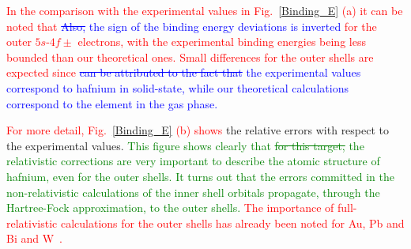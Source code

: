 \documentclass[aps,pra,reprint,superscriptaddress]{revtex4-1}
\def\clau#1{\textcolor{red}{#1}}
\def\duda#1{\textcolor{green}{#1}}
\def\ale#1{\textcolor{blue}{#1}}
\begin{document}
\clau{In the comparison with the experimental values in Fig.~\ref{Binding_E} (a) it can be noted that}
\ale{\st{Also,} the sign of the binding energy deviations is inverted}  \clau{for the outer $5s$-$4f\pm$ electrons, with the experimental binding energies being less bounded than our theoretical ones. Small differences for the outer shells are expected since } 
\ale{\st{can be attributed to the fact that} the experimental
values correspond to hafnium in solid-state, while our theoretical  calculations correspond to the element in the gas phase.}

\clau{For more detail, Fig.~\ref{Binding_E} (b) shows}  the relative errors %
with respect to the experimental  values. %
\duda{This figure shows clearly that \st{for this target,} the relativistic corrections are very important to describe
the atomic structure of hafnium, even for the outer shells.
It turns out that the errors committed in the non-relativistic calculations of the inner shell orbitals 
propagate, through the Hartree-Fock approximation, to the outer shells.} \clau{The importance of full-relativistic calculations for the outer shells has already been noted for Au, Pb and Bi and W~\cite{mon09}.}
\end{document}

